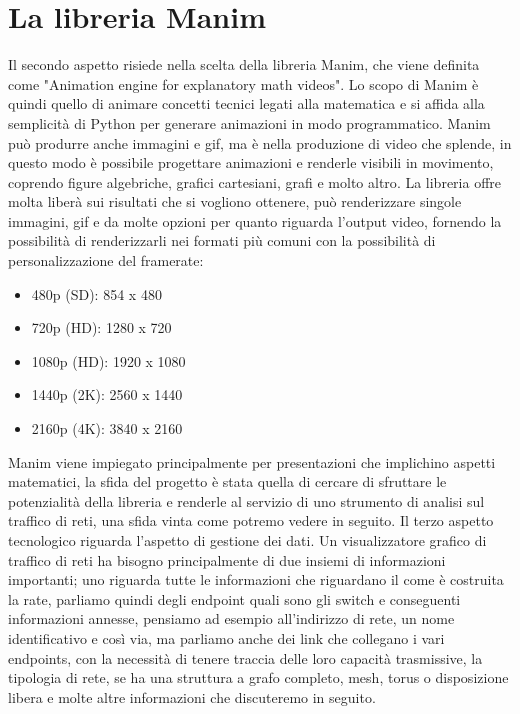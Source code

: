 \documentclass[binding=0.6cm]{sapthesis}
\begin{document}
\section{La libreria Manim}
Il secondo aspetto risiede nella scelta della libreria Manim\cite{Manim}, che viene definita come "Animation engine for explanatory math videos". Lo scopo di Manim è quindi
quello di animare concetti tecnici legati alla matematica e si affida alla semplicità di Python per generare animazioni in modo programmatico. Manim può produrre anche immagini e gif, ma è nella produzione di video che splende, in questo modo
è possibile progettare animazioni e renderle visibili in movimento, coprendo figure algebriche, grafici cartesiani, grafi e molto altro\cite{Manim}. 
La libreria offre molta liberà sui risultati che si vogliono ottenere, può renderizzare singole immagini, gif e da molte opzioni per quanto riguarda l'output video, fornendo la possibilità
di renderizzarli nei formati più comuni con la possibilità di personalizzazione del framerate:
\begin{itemize}	
    \item 480p (SD): 854 x 480
    \item 720p (HD): 1280 x 720
    \item 1080p (HD): 1920 x 1080
    \item 1440p (2K): 2560 x 1440
    \item 2160p (4K): 3840 x 2160
\end{itemize}
Manim viene impiegato principalmente per presentazioni che implichino aspetti matematici, la sfida del progetto è stata quella di 
cercare di sfruttare le potenzialità della libreria e renderle al servizio di uno strumento di analisi sul traffico di reti, una sfida vinta come potremo vedere in seguito.
Il terzo aspetto tecnologico riguarda l'aspetto di gestione dei dati. Un visualizzatore grafico di traffico di reti ha bisogno principalmente di due insiemi di informazioni importanti; uno riguarda tutte le informazioni
che riguardano il come è costruita la rate, parliamo quindi degli endpoint quali sono gli switch e conseguenti informazioni annesse, pensiamo ad esempio all'indirizzo di rete, un nome identificativo e così via, ma parliamo anche dei link che collegano
i vari endpoints, con la necessità di tenere traccia delle loro capacità trasmissive, la tipologia di rete, se ha una struttura a grafo completo, mesh, torus o disposizione libera e molte altre informazioni che discuteremo in seguito.
\end{document}

